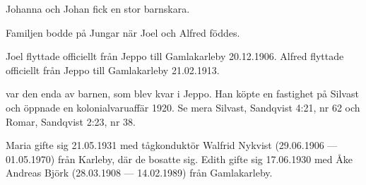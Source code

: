 Johanna och Johan fick en stor barnskara.
\begin{jhchildren}
  \item {}
  \item {}
  \item {}
  \item {}
  \item {}
  \item {}
  \item {}
  \item {}
  \item {}
\end{jhchildren}
Familjen bodde på Jungar när Joel och Alfred föddes.

Joel flyttade officiellt från Jeppo till Gamlakarleby 20.12.1906. Alfred flyttade officiellt från Jeppo till Gamlakarleby 21.02.1913.

 var den enda av barnen, som blev kvar i Jeppo. Han köpte en fastighet på Silvast och öppnade en kolonialvaruaffär 1920. Se mera 	Silvast, Sandqvist 4:21, nr 62 och Romar, Sandqvist 2:23, nr 38.

Maria gifte sig 21.05.1931 med tågkonduktör Walfrid Nykvist (29.06.1906 --- 01.05.1970) från Karleby, där de bosatte sig. Edith gifte sig 17.06.1930 med Åke Andreas Björk (28.03.1908 --- 14.02.1989) från Gamlakarleby.



%


